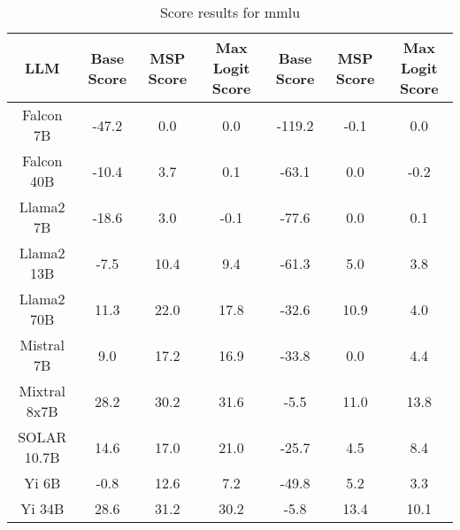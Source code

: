 \renewcommand\arraystretch{1.2}
\begin{table*}
\centering
\begin{tabular}{c|c|c|c|c|c|c}
LLM & Base Score & MSP Score & Max Logit Score & Base Score & MSP Score & Max Logit Score\\ \hline
Falcon 7B & -47.2 & 0.0 & 0.0 & -119.2 & -0.1 & 0.0\\
Falcon 40B & -10.4 & 3.7 & 0.1 & -63.1 & 0.0 & -0.2\\
Llama2 7B & -18.6 & 3.0 & -0.1 & -77.6 & 0.0 & 0.1\\
Llama2 13B & -7.5 & 10.4 & 9.4 & -61.3 & 5.0 & 3.8\\
Llama2 70B & 11.3 & 22.0 & 17.8 & -32.6 & 10.9 & 4.0\\
Mistral 7B & 9.0 & 17.2 & 16.9 & -33.8 & 0.0 & 4.4\\
Mixtral 8x7B & 28.2 & 30.2 & 31.6 & -5.5 & 11.0 & 13.8\\
SOLAR 10.7B & 14.6 & 17.0 & 21.0 & -25.7 & 4.5 & 8.4\\
Yi 6B & -0.8 & 12.6 & 7.2 & -49.8 & 5.2 & 3.3\\
Yi 34B & 28.6 & 31.2 & 30.2 & -5.8 & 13.4 & 10.1\\
\hline
\end{tabular}
\caption{Score results for mmlu}
\end{table*}
\label{tab:mmlu_score}
